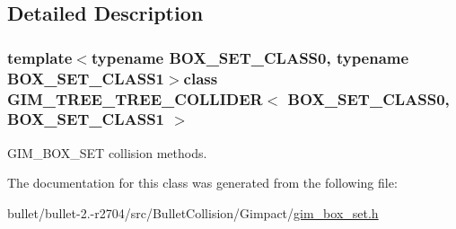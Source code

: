 \subsection{Detailed Description}
\subsubsection*{template$<$typename B\+O\+X\+\_\+\+S\+E\+T\+\_\+\+C\+L\+A\+S\+S0, typename B\+O\+X\+\_\+\+S\+E\+T\+\_\+\+C\+L\+A\+S\+S1$>$class G\+I\+M\+\_\+\+T\+R\+E\+E\+\_\+\+T\+R\+E\+E\+\_\+\+C\+O\+L\+L\+I\+D\+E\+R$<$ B\+O\+X\+\_\+\+S\+E\+T\+\_\+\+C\+L\+A\+S\+S0, B\+O\+X\+\_\+\+S\+E\+T\+\_\+\+C\+L\+A\+S\+S1 $>$}

G\+I\+M\+\_\+\+B\+O\+X\+\_\+\+S\+E\+T collision methods. 

The documentation for this class was generated from the following file\+:\begin{DoxyCompactItemize}
\item 
bullet/bullet-\/2.-\/r2704/src/\+Bullet\+Collision/\+Gimpact/\hyperlink{gim__box__set_8h}{gim\+\_\+box\+\_\+set.\+h}\end{DoxyCompactItemize}
